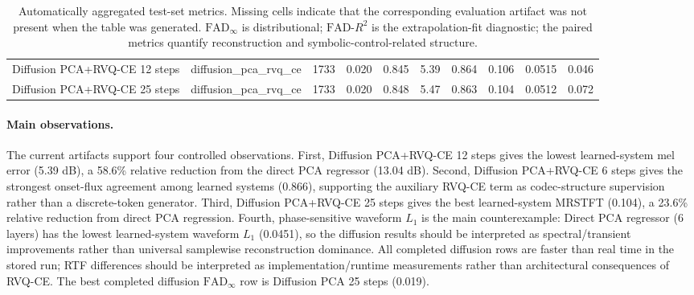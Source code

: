 \documentclass[11pt]{article}
\begin{document}
\begin{table}[t]
\begin{tabular}{llrrrrrrrr}
Diffusion PCA+RVQ-CE 12 steps & diffusion\_pca\_rvq\_ce & 1733 & 0.020 & 0.845 & 5.39 & 0.864 & 0.106 & 0.0515 & 0.046 \\
Diffusion PCA+RVQ-CE 25 steps & diffusion\_pca\_rvq\_ce & 1733 & 0.020 & 0.848 & 5.47 & 0.863 & 0.104 & 0.0512 & 0.072 \\
\bottomrule
\end{tabular}
\caption{Automatically aggregated test-set metrics. Missing cells indicate that the corresponding evaluation artifact was not present when the table was generated. $\mathrm{FAD}_{\infty}$ is distributional; $\mathrm{FAD}\text{-}R^2$ is the extrapolation-fit diagnostic; the paired metrics quantify reconstruction and symbolic-control-related structure.}
\label{tab:auto_main_results}
\end{table}

\paragraph{Main observations.}
The current artifacts support four controlled observations.
First, Diffusion PCA+RVQ-CE 12 steps gives the lowest learned-system mel error (5.39 dB), a 58.6\% relative reduction from the direct PCA regressor (13.04 dB).
Second, Diffusion PCA+RVQ-CE 6 steps gives the strongest onset-flux agreement among learned systems (0.866), supporting the auxiliary RVQ-CE term as codec-structure supervision rather than a discrete-token generator.
Third, Diffusion PCA+RVQ-CE 25 steps gives the best learned-system MRSTFT (0.104), a 23.6\% relative reduction from direct PCA regression.
Fourth, phase-sensitive waveform $L_1$ is the main counterexample: Direct PCA regressor (6 layers) has the lowest learned-system waveform $L_1$ (0.0451), so the diffusion results should be interpreted as spectral/transient improvements rather than universal samplewise reconstruction dominance.
All completed diffusion rows are faster than real time in the stored run; RTF differences should be interpreted as implementation/runtime measurements rather than architectural consequences of RVQ-CE.
The best completed diffusion $\mathrm{FAD}_{\infty}$ row is Diffusion PCA 25 steps (0.019).
\end{document}
